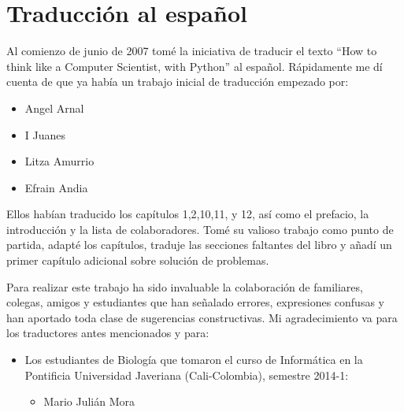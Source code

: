 


\chapter{Traducción al español}


Al comienzo de junio de 2007 tomé la iniciativa de traducir el texto 
``How to think like a Computer Scientist, with Python'' al español. Rápidamente
me dí cuenta de que ya había un trabajo inicial de traducción empezado por:

\begin{itemize}

\item Angel Arnal
\item I Juanes
\item Litza Amurrio
\item Efrain Andia

\end{itemize}

Ellos habían traducido los capítulos 1,2,10,11, y 12, así como el prefacio,
la introducción y la lista de colaboradores. Tomé su valioso trabajo como
punto de partida, adapté los capítulos, traduje las secciones faltantes 
del libro y añadí un primer capítulo adicional sobre solución de problemas.

Para realizar este trabajo ha sido invaluable la colaboración de familiares, 
colegas, amigos y estudiantes que han señalado errores, expresiones confusas y han 
aportado toda clase de sugerencias constructivas. Mi agradecimiento va para los
traductores antes mencionados y para:

\begin{itemize}

\item Los estudiantes de Biología que tomaron el curso de Informática
en la Pontificia Universidad Javeriana (Cali-Colombia), semestre 2014-1:

  \begin{itemize}
   \item Mario Julián Mora   
\end{itemize}
   
\end{itemize}

